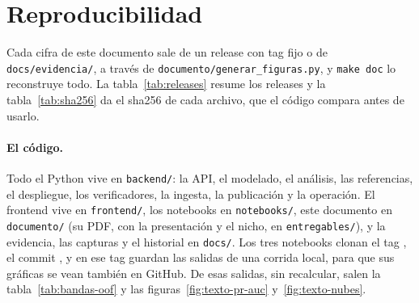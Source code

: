 \section{Reproducibilidad}\label{sec:anexo}

Cada cifra de este documento sale de un release con tag fijo o de \texttt{docs/evidencia/}, a través
de \texttt{documento/generar\_figuras.py}, y \texttt{make doc} lo reconstruye todo. La
tabla~\ref{tab:releases} resume los releases y la tabla~\ref{tab:sha256} da el sha256 de cada
archivo, que el código compara antes de usarlo.

\begin{table}[htbp]
  \centering\small
  
  \caption{Releases de datos. La base es la copia reproducible de la base de datos
  (\texttt{nexplay\_reproducible.db.xz}); el extracto, la tabla sin texto que lee el notebook 01
  (\texttt{nexplay\_extracto.parquet}). Fuente: API de releases de GitHub y los archivos bajados.}
  \label{tab:releases}
\end{table}

\begin{table}[htbp]
  \centering\scriptsize
  
  \caption{El sha256 de cada archivo de los releases, según GitHub. El generador falla si no es el
  mismo que usa el código.}
  \label{tab:sha256}
\end{table}

\paragraph{El código.} Todo el Python vive en \texttt{backend/}: la API, el modelado, el análisis,
las referencias, el despliegue, los verificadores, la ingesta, la publicación y la operación. El
frontend vive en \texttt{frontend/}, los notebooks en \texttt{notebooks/}, este documento en
\texttt{documento/} (su PDF, con la presentación y el nicho, en \texttt{entregables/}), y la evidencia, las capturas y el historial en \texttt{docs/}. Los tres
notebooks clonan el tag \mbox{\texttt{\cifraTagCodigo}}, el commit \texttt{\cifraCommitCodigo}, y en ese tag
guardan las salidas de una corrida local, para que sus gráficas se vean también en GitHub. De esas
salidas, sin recalcular, salen la tabla~\ref{tab:bandas-oof} y las
figuras~\ref{fig:texto-pr-auc} y~\ref{fig:texto-nubes}.

